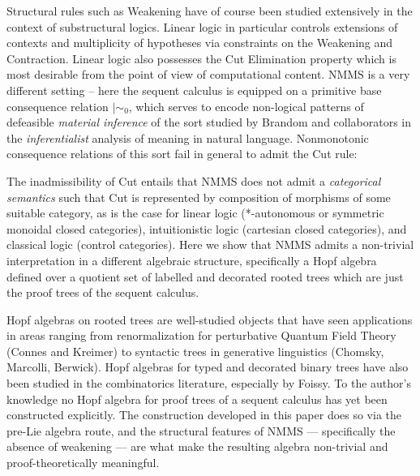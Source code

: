 \documentclass[11pt]{article}
\newcommand{\mszero}{\mathrel{\mid\!\sim_{0}}}
\begin{document}
Structural rules such as Weakening have of course been studied extensively in the context of substructural logics. Linear logic in particular controls extensions of contexts and multiplicity of hypotheses via constraints on the Weakening and Contraction. Linear logic also possesses the Cut Elimination property which is most desirable from the point of view of computational content. 
\vspace{0.2cm}
NMMS is a very different setting -- here the sequent calculus is equipped on a primitive {base} consequence relation $\mszero$, which serves to encode non-logical patterns of defeasible \emph{material inference} of the sort studied by Brandom and collaborators in the \emph{inferentialist} analysis of meaning in natural language. Nonmonotonic consequence relations of this sort fail in general to admit the Cut rule:

The inadmissibility of Cut entails that NMMS does not admit a \emph{categorical semantics} such that Cut is represented by composition of morphisms of some suitable category, as is the case for linear logic (*-autonomous or symmetric monoidal closed categories), intuitionistic logic (cartesian closed categories), and classical logic (control categories). Here we show that NMMS admits a non-trivial interpretation in a different algebraic structure, specifically a Hopf algebra defined over a quotient set of labelled and decorated rooted trees which are just the proof trees of the sequent calculus.

\vspace{0.2cm}

Hopf algebras on rooted trees are well-studied objects that have seen applications in areas ranging from renormalization for perturbative Quantum Field Theory (Connes and Kreimer) to syntactic trees in generative linguistics (Chomsky, Marcolli, Berwick). Hopf algebras for typed and decorated binary trees have also been studied in the combinatorics literature, especially by Foissy. To the author's knowledge no Hopf algebra for proof trees of a sequent calculus has yet been constructed explicitly. The construction developed in this paper does so via the pre-Lie algebra route, and the structural features of NMMS --- specifically the absence of weakening --- are what make the resulting algebra non-trivial and proof-theoretically meaningful.

\vspace{0.2cm}
\end{document}
